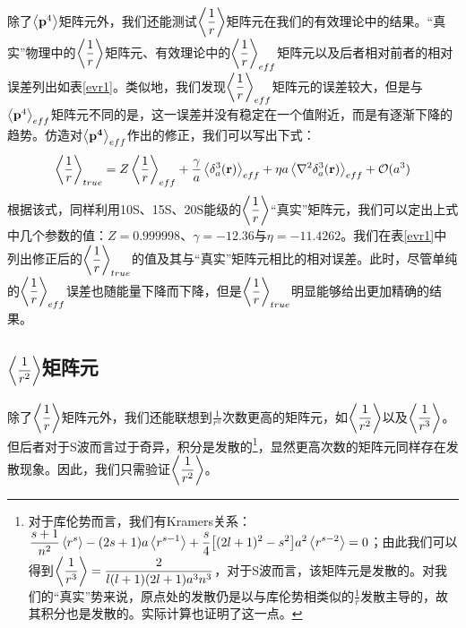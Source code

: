 \documentclass[cs4size,titlepage,twoside]{ctexart}
\begin{document}
除了$\expval{\vb{p}^4}$矩阵元外，我们还能测试$\displaystyle\expval{\frac{1}{r}}$矩阵元在我们的有效理论中的结果。“真实”物理中的$\displaystyle\expval{\frac{1}{r}}$矩阵元、有效理论中的$\displaystyle\expval{\frac{1}{r}}_{eff}$矩阵元以及后者相对前者的相对误差列出如表\ref{evr1}。类似地，我们发现$\displaystyle\expval{\frac{1}{r}}_{eff}$矩阵元的误差较大，但是与$\expval{\vb{p}^4}_{eff}$矩阵元不同的是，这一误差并没有稳定在一个值附近，而是有逐渐下降的趋势。仿造对$\expval{\vb{p^4}}_{eff}$作出的修正，我们可以写出下式：
\begin{equation}\label{rtrue}
	\expval{\frac{1}{r}}_{true}=Z\expval{\frac{1}{r}}_{eff}+\frac{\gamma}{a}\expval{\delta^3_a(\vb{r})}_{eff}+\eta a\expval{\laplacian{\delta^3_a(\vb{r})}}_{eff}+\mathcal{O}(a^3)
\end{equation}
根据该式，同样利用10S、15S、20S能级的$\displaystyle\expval{\frac{1}{r}}$“真实”矩阵元，我们可以定出上式中几个参数的值：$Z=0.999998$、$\gamma=-12.36$与$\eta=-11.4262$。我们在表\ref{evr1}中列出修正后的$\displaystyle\expval{\frac{1}{r}}_{true}$的值及其与“真实”矩阵元相比的相对误差。此时，尽管单纯的$\displaystyle\expval{\frac{1}{r}}_{eff}$误差也随能量下降而下降，但是$\displaystyle\expval{\frac{1}{r}}_{true}$明显能够给出更加精确的结果。
\subsection{$\displaystyle\expval{\frac{1}{r^2}}$矩阵元}
除了$\displaystyle\expval{\frac{1}{r}}$矩阵元外，我们还能联想到$\displaystyle\frac{1}{r^n}$次数更高的矩阵元，如$\displaystyle\expval{\frac{1}{r^2}}$以及$\displaystyle\expval{\frac{1}{r^3}}$。但后者对于S波而言过于奇异，积分是发散的\footnote{对于库伦势而言，我们有Kramers关系：$\displaystyle\frac{s+1}{n^2}\ev{r^s}-(2s+1)a\ev{r^{s-1}}+\frac{s}{4}\bqty{(2l+1)^2-s^2}a^2\ev{r^{s-2}}=0$；由此我们可以得到$\displaystyle\expval{\frac{1}{r^3}}=\frac{2}{l(l+1)(2l+1)a^3n^3}$，对于S波而言，该矩阵元是发散的。对我们的“真实”势来说，原点处的发散仍是以与库伦势相类似的$\frac{1}{r}$发散主导的，故其积分也是发散的。实际计算也证明了这一点。}，显然更高次数的矩阵元同样存在发散现象。因此，我们只需验证$\displaystyle\expval{\frac{1}{r^2}}$。
\end{document}
